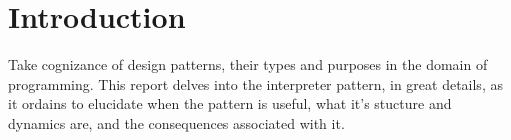 \section{Introduction}
Take cognizance of design patterns, their types and purposes in the domain of 
programming. This report delves into the interpreter pattern, in great details,
as it ordains to elucidate when the pattern is useful, what it's stucture and
dynamics are, and the consequences associated with it.






\newpage
